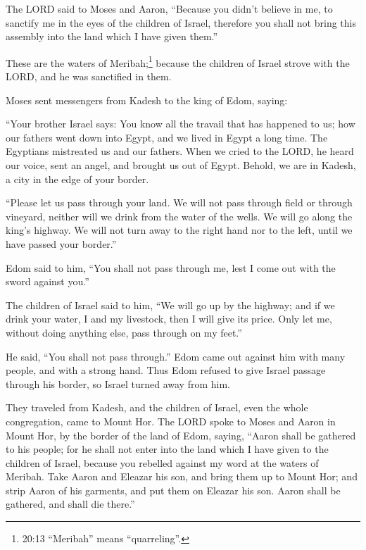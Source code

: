 \myverse{}The LORD said to Moses and Aaron, “Because you didn’t believe
in me, to sanctify me in the eyes of the children of Israel, therefore you shall not bring this assembly
into the land which I have given them.”


\myverse{}These are the waters of Meribah;\footnote{ 20:13 “Meribah” means “quarreling”.} because the children of Israel strove with the LORD, and
he was sanctified in them.


\myverse{}Moses sent messengers from Kadesh to the king of Edom, saying:

“Your brother Israel says: You know all the travail that has happened to us;
\myverse{}how our fathers went down into Egypt, and we lived in Egypt a long time.
The Egyptians mistreated us and our fathers.
\myverse{}When we cried to the LORD, he heard our voice, sent an angel, and brought
us out of Egypt. Behold, we are in Kadesh, a city in the edge of your border.


\myverse{}“Please let us pass through your land. We will not pass through
field or through vineyard, neither will we drink from the water of the wells. We will go along the king’s
highway. We will not turn away to the right hand nor to the left, until we have passed your border.”


\myverse{}Edom said to him, “You shall not pass through me, lest I come
out with the sword against you.”


\myverse{}The children of Israel said to him, “We will go up by the highway;
and if we drink your water, I and my livestock, then I will give its price. Only let me, without doing
anything else, pass through on my feet.”


\myverse{}He said, “You shall not pass through.” Edom came out against
him with many people, and with a strong hand.
\myverse{}Thus Edom refused to give Israel passage through his border, so Israel turned
away from him.


\myverse{}They traveled from Kadesh, and the children of Israel, even
the whole congregation, came to Mount Hor.
\myverse{}The LORD spoke to Moses and Aaron in Mount Hor, by the border of the land
of Edom, saying,
\myverse{}“Aaron shall be gathered to his people; for he shall not enter into the land
which I have given to the children of Israel, because you rebelled against my word at the waters of Meribah.
\myverse{}Take Aaron and Eleazar his son, and bring them up to Mount Hor;
\myverse{}and strip Aaron of his garments, and put them on Eleazar his son. Aaron shall
be gathered, and shall die there.”



